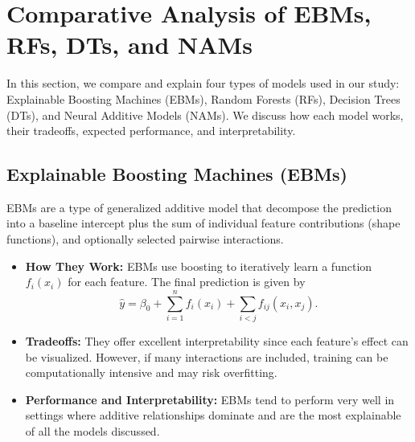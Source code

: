 \documentclass{article}
\begin{document}
\section{Comparative Analysis of EBMs, RFs, DTs, and NAMs}

In this section, we compare and explain four types of models used in our study: Explainable Boosting Machines (EBMs), Random Forests (RFs), Decision Trees (DTs), and Neural Additive Models (NAMs). We discuss how each model works, their tradeoffs, expected performance, and interpretability.

\subsection*{Explainable Boosting Machines (EBMs)}
EBMs are a type of generalized additive model that decompose the prediction into a baseline intercept plus the sum of individual feature contributions (shape functions), and optionally selected pairwise interactions.  
\begin{itemize}
    \item \textbf{How They Work:} EBMs use boosting to iteratively learn a function \( f_i(x_i) \) for each feature. The final prediction is given by
    \[
    \hat{y} = \beta_0 + \sum_{i=1}^{n} f_i(x_i) + \sum_{i<j} f_{ij}(x_i, x_j).
    \]
    \item \textbf{Tradeoffs:} They offer excellent interpretability since each feature's effect can be visualized. However, if many interactions are included, training can be computationally intensive and may risk overfitting.
    \item \textbf{Performance and Interpretability:} EBMs tend to perform very well in settings where additive relationships dominate and are the most explainable of all the models discussed.
\end{itemize}
\end{document}
